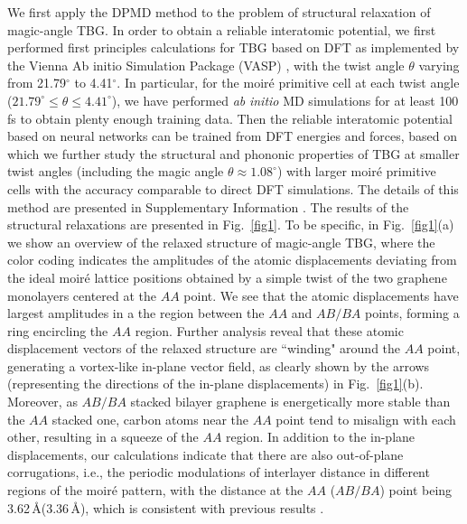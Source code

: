 \documentclass[aps,prl,twocolumn,amsmath,amssymb]{revtex4-2}
\def\angstrom{\mbox{\normalfont\AA}}
\begin{document}
We first apply the DPMD method to the problem of structural relaxation of magic-angle TBG.  In order to obtain a reliable interatomic potential, we first performed first principles calculations for TBG based on DFT as implemented by the Vienna Ab initio Simulation Package (VASP)\cite{vasp} , with the twist angle $\theta$ varying from 21.79$^{\circ}$ to 4.41$^{\circ}$. In particular, for the moir\'e primitive cell at each twist angle ($21.79^{\circ}\leq\theta\leq\!4.41^{\circ}$), we have performed \textit{ab} \textit{initio} MD simulations for at least 100\,fs to obtain plenty enough training data.  Then the reliable interatomic potential based on neural networks can be trained from DFT energies and forces, based on which we further study the structural and phononic properties of TBG at smaller twist angles (including the magic angle $\theta\!\approx\!1.08^{\circ}$) with larger moir\'e primitive cells with the accuracy comparable to direct DFT simulations. %
The details of this method are presented in Supplementary Information \cite{supp_info}. 
The results of the structural relaxations are presented in Fig.~\ref{fig1}. To be specific, in Fig.~\ref{fig1}(a) we show an overview of the relaxed structure of magic-angle TBG, where the color coding indicates the amplitudes of the atomic displacements deviating from the ideal moir\'e lattice positions obtained by a simple twist of the two graphene monolayers centered at the $AA$ point. We see that the atomic displacements have largest amplitudes in a the region between the $AA$ and $AB/BA$ points, forming a ring encircling the $AA$ region. Further analysis reveal that these atomic displacement vectors of the relaxed structure are ``winding" around the $AA$ point, generating a vortex-like in-plane vector field, as clearly shown by the arrows (representing the directions of the in-plane displacements) in Fig.~\ref{fig1}(b). Moreover, as $AB/BA$ stacked bilayer graphene is energetically more stable than the $AA$ stacked one, carbon atoms near the $AA$ point tend to misalign with each other, resulting in a squeeze of the $AA$ region.  In addition to the in-plane displacements, our calculations indicate that there are also out-of-plane corrugations, i.e., the periodic modulations of interlayer distance in different regions of the moir\'e pattern, with the distance at the $AA$ ($AB/BA$) point being 3.62\,\angstrom (3.36\,\angstrom), which is consistent with previous results \cite{tbg-corrugation-prb14,angeli-d6-prb18,koshino-prb17,tbg-relax-prr19}. 
\end{document}
